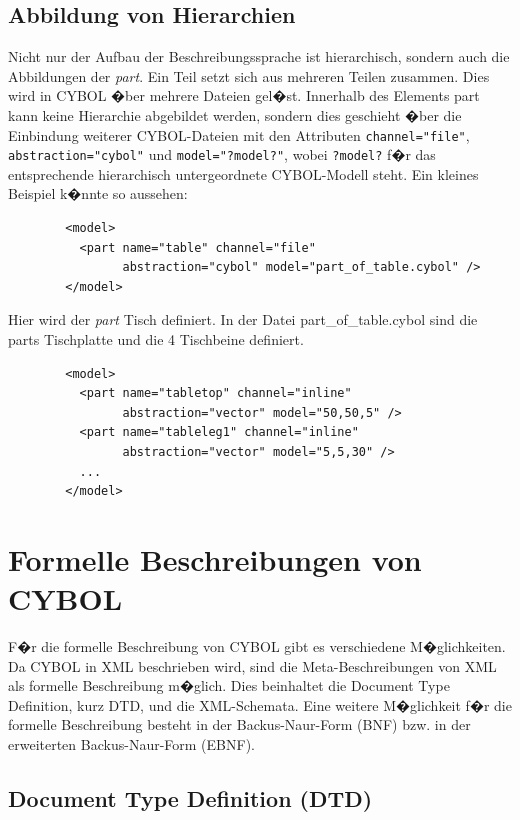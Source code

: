     \subsection{Abbildung von Hierarchien}
      \label{abbhierarchie}
      Nicht nur der Aufbau der Beschreibungssprache ist hierarchisch, sondern auch die Abbildungen
      der \emph{part}. Ein Teil setzt sich aus mehreren Teilen zusammen. Dies wird in 
      CYBOL �ber mehrere Dateien gel�st. 
      Innerhalb des Elements part kann keine Hierarchie abgebildet werden, sondern dies geschieht �ber 
      die Einbindung weiterer CYBOL-Dateien mit den  Attributen     
      \verb|channel="file"|, \verb|abstraction="cybol"| und 
      \verb|model="?model?"|, wobei \verb|?model?| f�r das entsprechende hierarchisch 
      untergeordnete CYBOL-Modell steht.
      Ein kleines Beispiel k�nnte so aussehen:
\begin{verbatim}
        <model>
          <part name="table" channel="file" 
                abstraction="cybol" model="part_of_table.cybol" />
        </model>
\end{verbatim}
      Hier wird der \emph{part} Tisch definiert. In der Datei part\_of\_table.cybol sind die parts Tischplatte
      und die 4 Tischbeine definiert.
\begin{verbatim}
        <model>
          <part name="tabletop" channel="inline" 
                abstraction="vector" model="50,50,5" />
          <part name="tableleg1" channel="inline" 
                abstraction="vector" model="5,5,30" />
          ...
        </model>
\end{verbatim}

  \section{Formelle Beschreibungen von CYBOL}
      
    F�r die formelle Beschreibung von CYBOL gibt es verschiedene M�glichkeiten. Da
    CYBOL in XML beschrieben wird, sind die Meta-Beschreibungen von XML als formelle
    Beschreibung m�glich. Dies beinhaltet die  Document Type Definition, kurz DTD, und
    die XML-Schemata. Eine weitere M�glichkeit f�r die formelle Beschreibung besteht in der 
    Backus-Naur-Form (BNF) bzw. in der erweiterten Backus-Naur-Form (EBNF). 
    
    \subsection{Document Type Definition (DTD)}

